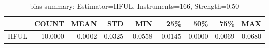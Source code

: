 \begin{table}[ht]
\centering
\caption{bias summary: Estimator=HFUL, Instruments=166, Strength=0.50}
\begin{tabular}{lrrrrrrrr}
\toprule
 & COUNT & MEAN & STD & MIN & 25\% & 50\% & 75\% & MAX \\
\midrule
HFUL & 10.0000 & 0.0002 & 0.0325 & -0.0558 & -0.0145 & 0.0000 & 0.0069 & 0.0680 \\
\bottomrule
\end{tabular}
\end{table}
